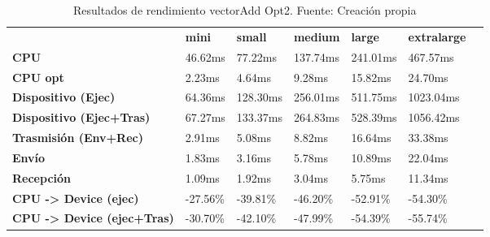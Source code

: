 \begin{table}[H]
    \centering
    \begin{tabular}{lllllll}
    \rowcolor[HTML]{DAE8FC} \ &  \textbf{mini} &  \textbf{small} &  \textbf{medium} &  \textbf{	large} &  \textbf{	extralarge} \\
    \cellcolor[HTML]{DAE8FC} \textbf{CPU} & 46.62ms & 77.22ms & 137.74ms & 	241.01ms & 	467.57ms \\
    \rowcolor[HTML]{EFEFEF} \cellcolor[HTML]{DAE8FC} \textbf{CPU opt} & 2.23ms & 4.64ms & 9.28ms & 	15.82ms & 	24.70ms \\
    \cellcolor[HTML]{DAE8FC} \textbf{Dispositivo (Ejec)} & 64.36ms & 128.30ms & 256.01ms & 	511.75ms & 	1023.04ms \\
    \rowcolor[HTML]{EFEFEF} \cellcolor[HTML]{DAE8FC} \textbf{Dispositivo (Ejec+Tras)} & 67.27ms & 133.37ms & 264.83ms & 	528.39ms & 	1056.42ms \\
    \cellcolor[HTML]{DAE8FC} \textbf{Trasmisión (Env+Rec)} & 2.91ms & 5.08ms & 8.82ms & 	16.64ms & 	33.38ms \\
    \rowcolor[HTML]{EFEFEF} \cellcolor[HTML]{DAE8FC} \textbf{Envío} & 1.83ms & 3.16ms & 5.78ms & 	10.89ms & 	22.04ms \\
    \cellcolor[HTML]{DAE8FC} \textbf{Recepción} & 1.09ms & 1.92ms & 3.04ms & 	5.75ms & 	11.34ms \\
    \rowcolor[HTML]{EFEFEF} \cellcolor[HTML]{DAE8FC} \textbf{CPU -> Device (ejec)} & -27.56\% & -39.81\% & -46.20\% & 	-52.91\% & 	-54.30\% \\
    \cellcolor[HTML]{DAE8FC} \textbf{CPU -> Device (ejec+Tras)} & -30.70\% & -42.10\% & -47.99\% & 	-54.39\% & 	-55.74\% \\
    \end{tabular}
    \caption[Resultados de rendimiento vectorAdd Opt2]{{Resultados de rendimiento vectorAdd Opt2. Fuente: Creación propia}}
    \label{table_test_vectorAdd_Opt2_hw_performanceResults}
\end{table}